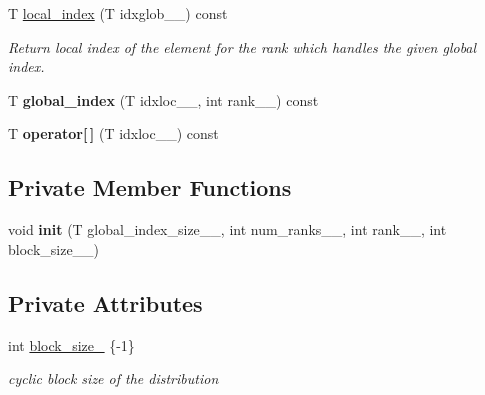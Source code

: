 \begin{DoxyCompactItemize}
T \hyperlink{classsddk_1_1splindex_3_01block__cyclic_00_01_t_01_4_a41a013d37c85a5fca2291dd4a4f303a1}{local\+\_\+index} (T idxglob\+\_\+\+\_\+) const 
\begin{DoxyCompactList}\small\item\em Return local index of the element for the rank which handles the given global index. \end{DoxyCompactList}\item 
\hypertarget{classsddk_1_1splindex_3_01block__cyclic_00_01_t_01_4_a7d895e9d73c4a4a5cd0de090362c0af7}{}T {\bfseries global\+\_\+index} (T idxloc\+\_\+\+\_\+, int rank\+\_\+\+\_\+) const \label{classsddk_1_1splindex_3_01block__cyclic_00_01_t_01_4_a7d895e9d73c4a4a5cd0de090362c0af7}

\item 
\hypertarget{classsddk_1_1splindex_3_01block__cyclic_00_01_t_01_4_aab28c3139c25d1640f68ebc74a4079e0}{}T {\bfseries operator\mbox{[}$\,$\mbox{]}} (T idxloc\+\_\+\+\_\+) const \label{classsddk_1_1splindex_3_01block__cyclic_00_01_t_01_4_aab28c3139c25d1640f68ebc74a4079e0}

\end{DoxyCompactItemize}
\subsection*{Private Member Functions}
\begin{DoxyCompactItemize}
\item 
\hypertarget{classsddk_1_1splindex_3_01block__cyclic_00_01_t_01_4_a1dba2c9d9b09c937cdf70b180eed6719}{}void {\bfseries init} (T global\+\_\+index\+\_\+size\+\_\+\+\_\+, int num\+\_\+ranks\+\_\+\+\_\+, int rank\+\_\+\+\_\+, int block\+\_\+size\+\_\+\+\_\+)\label{classsddk_1_1splindex_3_01block__cyclic_00_01_t_01_4_a1dba2c9d9b09c937cdf70b180eed6719}

\end{DoxyCompactItemize}
\subsection*{Private Attributes}
\begin{DoxyCompactItemize}
\item 
int \hyperlink{classsddk_1_1splindex_3_01block__cyclic_00_01_t_01_4_ac32a632137604b0e84304c053618fe36}{block\+\_\+size\+\_\+} \{-\/1\}
\begin{DoxyCompactList}\small\item\em cyclic block size of the distribution \end{DoxyCompactList}\end{DoxyCompactItemize}

